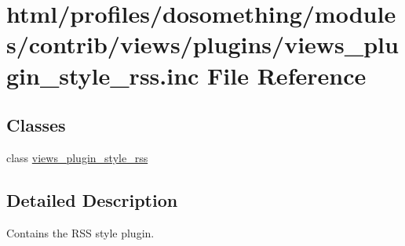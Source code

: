\hypertarget{views__plugin__style__rss_8inc}{
\section{html/profiles/dosomething/modules/contrib/views/plugins/views\_\-plugin\_\-style\_\-rss.inc File Reference}
\label{views__plugin__style__rss_8inc}
}
\subsection*{Classes}
\begin{DoxyCompactItemize}
\item 
class \hyperlink{classviews__plugin__style__rss}{views\_\-plugin\_\-style\_\-rss}
\end{DoxyCompactItemize}


\subsection{Detailed Description}
Contains the RSS style plugin. 